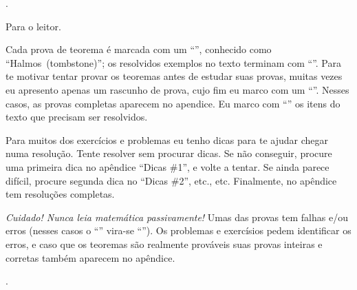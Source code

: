 
\chapteroid \prefacename.

\sectionoid Para o leitor.

Cada prova de teorema é marcada com um ``\thinspace\qedsymbol\thinspace'',
conhecido como ``Halmos\Halmos[tombstone]~(tombstone)'';
os resolvidos exemplos no texto terminam com ``\thinspace\qexsymbol\thinspace''.
Para te motivar tentar provar os teoremas antes de estudar suas provas,
muitas vezes eu apresento apenas um rascunho de prova,
cujo fim eu marco com um ``\thinspace\qessymbol\thinspace''.
Nesses casos, as provas completas aparecem no apendice.
Eu marco com ``\thinspace\activitysymbol\thinspace'' os itens do texto que
precisam ser resolvidos.

Para muitos dos exercícios e problemas eu tenho dicas para te ajudar chegar
numa resolução.  Tente resolver sem procurar dicas.
Se não conseguir, procure uma primeira dica no apêndice ``Dicas \#1'',
e volte a tentar.
Se ainda parece difícil, procure segunda dica no ``Dicas \#2'',
etc., etc.
Finalmente, no apêndice tem resoluções completas.

\emph{Cuidado! Nunca leia matemática passivamente!}
Umas das provas tem falhas e/ou erros
(nesses casos o ``\thinspace\qedsymbol\thinspace''
vira-se ``\thinspace\mistakesymbol\thinspace'').
Os problemas e exercísios pedem identificar os erros,
e caso que os teoremas são realmente prováveis suas provas
inteiras e corretas também aparecem no apêndice.

\endsectionoid

\endchapteroid





{
\partpage
\hbox{}\vfil
\twentyfourbf
\centerline{\appendicesname}
\titlepagetrue
\vfil
\vfil
\eject
}

\appendix \proofsname.

{%
\immediate\closeout\fullproofsfile
\innernewcount\curchapterno

\def\fullproofentry#1#2#3{%
\ifnum#1>\curchapterno
\curchapterno=#1
\centerline{\fourteenbf\chaptername~#1}\vskip\fullproofskip
\fi
\noindent{\bf #2.}
#3
\goodbreak\vskip\fullproofskip
}

}


